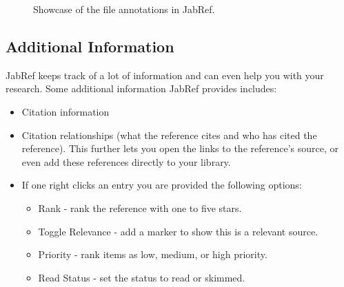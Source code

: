 				\begin{figure}[htbp]
					\centering
					\caption{Showcase of the file annotations in JabRef.}
					\label{fig:JabRefFileAnnotations}
				\end{figure}

		\subsection{Additional Information}
			JabRef keeps track of a lot of information and can even help you with your research.
			Some additional information JabRef provides includes:
			\begin{itemize}
				\item Citation information
				\item Citation relationships (what the reference cites and who has cited the reference). 
					This further lets you open the links to the reference's source, or even add these references directly to your library.
				\item If one right clicks an entry you are provided the following options:
					\begin{itemize}
						\item Rank - rank the reference with one to five stars.
						\item Toggle Relevance - add a marker to show this is a relevant source.
						\item Priority - rank items as low, medium, or high priority.
						\item Read Status - set the status to read or skimmed.
					\end{itemize}
			\end{itemize}